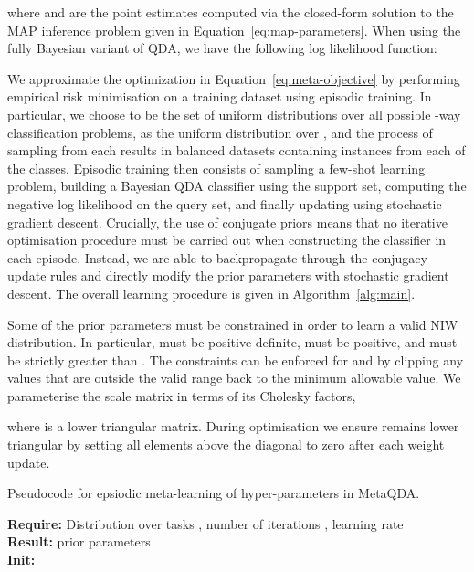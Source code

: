 \documentclass[10pt,twocolumn,letterpaper]{article}
\begin{document}
where  and  are the point estimates computed via the closed-form solution to the MAP inference problem given in Equation~\ref{eq:map-parameters}. When using the fully Bayesian variant of QDA, we have the following log likelihood function:


We approximate the optimization in Equation~\ref{eq:meta-objective} by performing empirical risk minimisation on a training dataset using episodic training. In particular, we choose  to be the set of uniform distributions over all possible -way classification problems,  as the uniform distribution over , and the process of sampling from each  results in balanced datasets containing  instances from each of the  classes. Episodic training then consists of sampling a few-shot learning problem, building a Bayesian QDA classifier using the support set, computing the negative log likelihood on the query set, and finally updating  using stochastic gradient descent. Crucially, the use of conjugate priors means that no iterative optimisation procedure must be carried out when constructing the classifier in each episode. Instead, we are able to backpropagate through the conjugacy update rules and directly modify the prior parameters with stochastic gradient descent. The overall learning procedure is given in Algorithm~\ref{alg:main}.

Some of the prior parameters must be constrained in order to learn a valid NIW distribution. In particular,  must be positive definite,  must be positive, and  must be strictly greater than . The constraints can be enforced for  and  by clipping any values that are outside the valid range back to the minimum allowable value. We parameterise the scale matrix in terms of its Cholesky factors,

where  is a lower triangular matrix. During optimisation we ensure  remains lower triangular by setting all elements above the diagonal to zero after each weight update.



\begin{algorithm}[t]
\caption{Pseudocode for epsiodic meta-learning of hyper-parameters in MetaQDA.}\label{alg:main}
\textbf{Require:} Distribution over tasks , number of iterations , learning rate  \\
\textbf{Result:} prior parameters  \\
\textbf{Init:}  \\
\end{algorithm}
\end{document}
